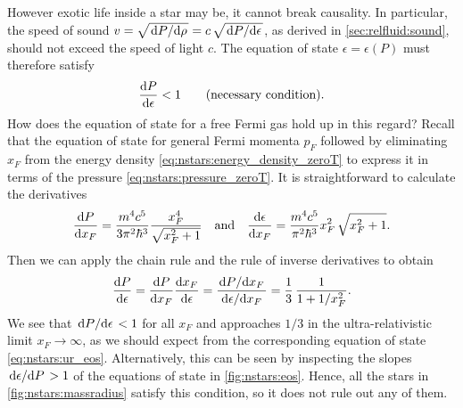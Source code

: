 However exotic life inside a star may be, it cannot break causality. 
In particular, the speed of sound $v = \sqrt{\odv{P}/{\rho}} = c \, \sqrt{\odv{P}/{\epsilon}}$, as derived in \cref{sec:relfluid:sound}, should not exceed the speed of light $c$.
The equation of state $\epsilon = \epsilon(P)$ must therefore satisfy
\begin{equation}
	\odv{P}{\epsilon} < 1
	\qquad \text{(necessary condition)} .
\end{equation}
How does the equation of state for a free Fermi gas hold up in this regard?
Recall that the equation of state for general Fermi momenta $p_F$ followed by eliminating $x_F$ from the energy density \eqref{eq:nstars:energy_density_zeroT} to express it in terms of the pressure \eqref{eq:nstars:pressure_zeroT}.
It is straightforward to calculate the derivatives
\begin{equation}
	\odv{P}{x_F} = \frac{m^4 c^5}{3 \pi^2 \hbar^3} \frac{x_F^4}{\sqrt{x_F^2 + 1}}
	\quad \text{and} \quad
	\odv{\epsilon}{x_F} = \frac{m^4 c^5}{\pi^2 \hbar^3} x_F^2 \, \sqrt{x_F^2 + 1} .
\end{equation}
Then we can apply the chain rule and the rule of inverse derivatives to obtain
\begin{equation}
	\odv{P}{\epsilon} = 
	\odv{P}{x_F} \odv{x_F}{\epsilon} =
	\frac{\odv{P}/{x_F}}{\odv{\epsilon}/{x_F}} =
	\frac13 \, \frac{1}{1+1/x_F^2}.
\label{eq:nstars:dPde}
\end{equation}
We see that $\odv{P}/{\epsilon} < 1$ for all $x_F$ and approaches $1/3$ in the ultra-relativistic limit $x_F \rightarrow \infty$, as we should expect from the corresponding equation of state \eqref{eq:nstars:ur_eos}.
Alternatively, this can be seen by inspecting the slopes $\odv{\epsilon}/{P} > 1$ of the equations of state in \cref{fig:nstars:eos}.
Hence, all the stars in \cref{fig:nstars:massradius} satisfy this condition, so it does not rule out any of them.

